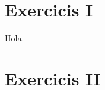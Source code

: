 \appendix
\section{Exercicis I}
\label{appendExe1}

Hola.

\appendix
\section{Exercicis II}
\label{appendExe2}
